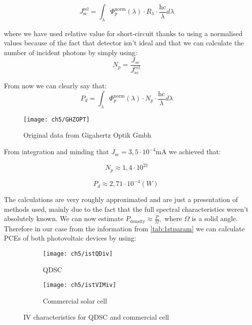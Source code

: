 \begin{equation}
J_{\text{sc}}^{\text{rel}} = \int_{\lambda}^{}{\Phi_{p}^{\text{norm}}\left( \lambda \right) \cdot R_{\lambda} \cdot \frac{\text{hc}}{\lambda}d\lambda }
\end{equation}


 where we have used relative value for short-circuit thanks to using a
normalised values because of the fact that detector isn't ideal and that
we can calculate the number of incident photons by simply using:
\begin{equation}
N_{p} = \frac{J_{sc}}{J_{sc}^{rel}}
\end{equation}

 From now we can clearly say that:
\begin{equation}
P_{d} = \int_{\lambda}^{}{\Phi_{p}^{\text{norm}}\left( \lambda \right) \cdot N_{p} \cdot \frac{\text{hc}}{\lambda}d \lambda }
\end{equation}

\begin{figure}[H]
\center
\texttt{[image: ch5/GHZOPT]}
\caption{Original data from Gigahertz Optik Gmbh}
\end{figure}

 From integration and minding that
\(J_{\text{sc}} = 3,5 \cdot 10^{- 4}\text{mA\ }\)we achieved that:

\[N_{p} \approx 1,4 \cdot 10^{21}\]

\[P_{d} \approx 2,71 \cdot 10^{-4} \left( W \right)\ \]

 The calculations are very roughly approximated and are just a
presentation of methods used, mainly due to the fact that the full
spectral characteristics weren't absolutely known. We can now estimate
\(P_{\text{density}} \approx \frac{P}{\Omega},\) where \(\Omega\) is a
solid angle. Therefore in our case from the information from \ref{tab:1stparam} we can calculate PCEs of both
photovoltaic devices by using:
\begin{figure}[b]
	\centering
	\begin{subfigure}[b]{0.49\textwidth}
	\centering
	\texttt{[image: ch5/istQDiv]}
	\caption{QDSC}
	\end{subfigure}
	\hfill
	\begin{subfigure}[b]{0.49\textwidth}
	\centering
	\texttt{[image: ch5/istVIMiv]}
	\caption{Commercial solar cell}{}
	\end{subfigure}
	\caption{IV characteristics for QDSC and commercial cell }
\end{figure}

